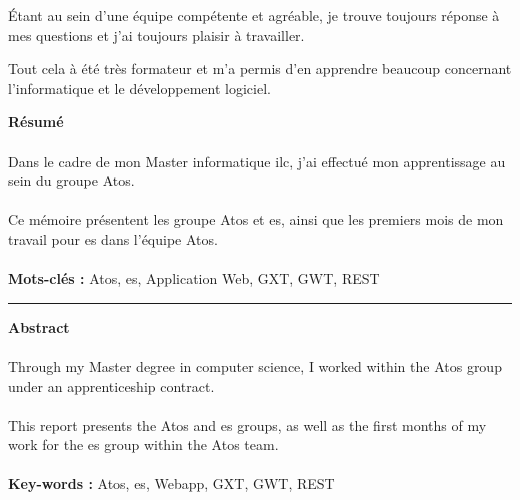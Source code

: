 \documentclass[12pt]{report}
\newcommand{\printAbstract}[4]
{
    \newpage
    \thispagestyle{empty}
    \setlength{\parskip}{-0.5em}
    \vspace*{\fill}
    \vspace{2em}
    \noindent\textbf{\LARGE Résumé}\\
    \p
    #1
    \p
    \textbf{Mots-clés :} #2
    \vspace{1em}
    \hrule
    \vspace{1.5em}
    \noindent\textbf{\LARGE Abstract}\\
    \p
    #3
    \p
    \textbf{Key-words : } #4
    \vspace*{\fill}
}
\newcommand{\fin}
{
    \label{Fin}
    \printglossary
    \printglossary[type=\acronymtype]
    \printbibliography[heading=bibintoc,title={Bibliographie}] %
}
\newcommand{\p}{\paragraph{}}
\begin{document}
    Étant au sein d'une équipe compétente et agréable, je trouve toujours réponse à mes questions et j'ai toujours plaisir à travailler.
    
    Tout cela à été très formateur et m'a permis d'en apprendre beaucoup concernant l'informatique et le développement logiciel.
    
	\fin
	
    \printAbstract{
        Dans le cadre de mon Master informatique \acrlong{ilc}, j'ai effectué mon apprentissage au sein du groupe Atos.
        \p
        Ce mémoire présentent les groupe Atos et \acrshort{es}, ainsi que les premiers mois de mon travail pour \acrshort{es} dans l'équipe Atos.
    }
    {Atos, \acrshort{es}, Application Web, GXT, GWT, REST}
    {
        Through my Master degree in computer science, I worked within the Atos group under an apprenticeship contract.
        \p
        This report presents the Atos and \acrshort{es} groups, as well as the first months of my work for the \acrshort{es} group within the Atos team.
    }
    {Atos, \acrshort{es}, Webapp, GXT, GWT, REST}
    
\end{document}
